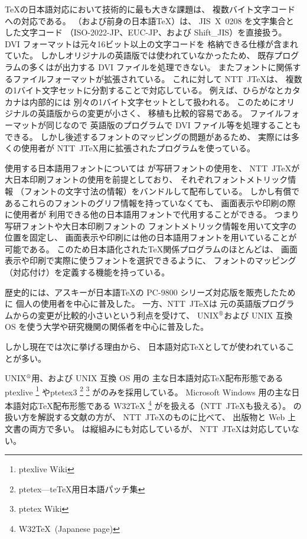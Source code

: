 \documentclass{jsarticle}
\def\RM{\leavevmode\hbox{$^{\mbox{\scriptsize\textregistered}}$}}
\begin{document}
\TeX の日本語対応において技術的に最も大きな課題は、
複数バイト文字コードへの対応である。
\pTeX（および前身の日本語\TeX）は、
JIS~X~0208 を文字集合とした文字コード
（ISO-2022-JP、EUC-JP、および Shift\_JIS）を直接扱う。
DVI フォーマットは元々16ビット以上の文字コードを
格納できる仕様が含まれていた。
しかしオリジナルの英語版では使われていなかったため、
既存プログラムの多くは\pTeX が出力する DVI ファイルを処理できない。
またフォントに関係するファイルフォーマットが拡張されている。
これに対して NTT~J\TeX は、
複数の1バイト文字セットに分割することで対応している。
例えば、ひらがなとカタカナは内部的には
別々の1バイト文字セットとして扱われる。
このためにオリジナルの英語版からの変更が小さく、
移植も比較的容易である。
ファイルフォーマットが同じなので
英語版のプログラムで DVI ファイル等を処理することもできる。
しかし後述するフォントのマッピングの問題があるため、
実際には多くの使用者が NTT~J\TeX 用に拡張されたプログラムを使っている。

使用する日本語用フォントについては 
\pTeX が写研フォントの使用を、
NTT~J\TeX が大日本印刷フォントの使用を前提としており、
それぞれフォントメトリック情報
（フォントの文字寸法の情報）をバンドルして配布している。
しかし有償であるこれらのフォントのグリフ情報を持っていなくても、
画面表示や印刷の際に使用者が
利用できる他の日本語用フォントで代用することができる。
つまり写研フォントや大日本印刷フォントの
フォントメトリック情報を用いて文字の位置を固定し、
画面表示や印刷には他の日本語用フォントを用いていることが可能である。
このため日本語化された\TeX 関係プログラムのほとんどは、
画面表示や印刷で実際に使うフォントを選択できるように、
フォントのマッピング（対応付け）を定義する機能を持っている。

歴史的には、アスキーが日本語\TeX の 
PC-9800 シリーズ対応版を販売したために
個人の使用者を中心に普及した。
一方、NTT~J\TeX は
元の英語版プログラムからの変更が比較的小さいという利点を受けて、
UNIX\RM および UNIX 互換 OS を使う大学や研究機関の関係者を中心に普及した。

しかし現在では次に挙げる理由から、
日本語対応\TeX として\pTeX が使われていることが多い。

UNIX\RM 用、および UNIX 互換 OS 用の
主な日本語対応\TeX 配布形態である 
ptexlive%
\footnote{ptexlive Wiki}%
やptetex3%
\footnote{ptetex---te\TeX 用日本語パッチ集}%
\footnote{ptetex Wiki}%
が\pTeX のみを採用している。
Microsoft Windows 用の主な日本語対応\TeX 配布形態である 
W32\TeX%
\footnote{W32\TeX\ (Japanese page)}%
が\pTeX を扱える（NTT~J\TeX も扱える）。
\pTeX の扱い方を解説する文献の方が、
NTT~J\TeX のものに比べて、
出版物と Web 上文書の両方で多い。
\pTeX は縦組みにも対応しているが、
NTT~J\TeX は対応していない。
\end{document}

